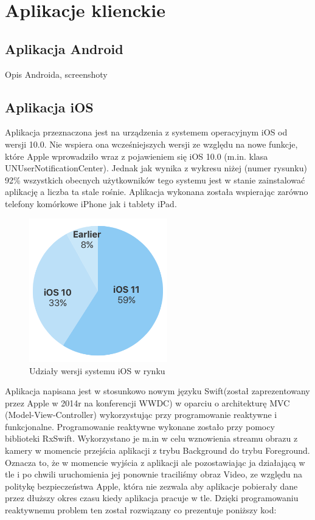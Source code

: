 \chapter{Aplikacje klienckie}

\section*{Aplikacja Android}

Opis Androida, screenshoty


\section*{Aplikacja iOS}
Aplikacja przeznaczona jest na urządzenia z systemem operacyjnym iOS od wersji 10.0. 
Nie wspiera ona wcześniejszych wersji ze względu na nowe funkcje, które Apple wprowadziło wraz z pojawieniem się iOS 10.0 (m.in. klasa UNUserNotificationCenter). Jednak jak wynika z wykresu niżej (numer rysunku) 92\% wszystkich obecnych użytkowników tego systemu jest w stanie zainstalować aplikację a liczba ta stale rośnie. Aplikacja wykonana została wspierając zarówno telefony komórkowe iPhone jak i tablety iPad. 
\begin{figure}[h]
	\centering
	\includegraphics[width=6cm]{iOSstat}
	\caption{Udziały wersji systemu iOS w rynku}
\end{figure}
Aplikacja napisana jest w stosunkowo nowym języku Swift(został zaprezentowany przez Apple w 2014r na konferencji WWDC) w oparciu o architekturę MVC (Model-View-Controller) wykorzystując przy programowanie reaktywne i funkcjonalne. 
Programowanie reaktywne wykonane zostało przy pomocy biblioteki RxSwift. Wykorzystano je m.in w celu wznowienia streamu obrazu z kamery w momencie przejścia aplikacji z trybu Background do trybu Foreground. Oznacza to, że w momencie wyjścia z aplikacji ale pozostawiając ja działającą w tle i po chwili uruchomienia jej ponownie traciliśmy obraz Video, ze względu na politykę bezpieczeństwa Apple, która nie zezwala aby aplikacje pobierały dane przez dłuższy okres czasu kiedy aplikacja pracuje w tle. Dzięki programowaniu reaktywnemu problem ten został rozwiązany co prezentuje poniższy kod:
